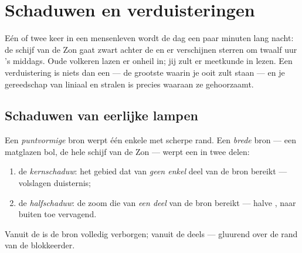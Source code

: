 \chapter{Schaduwen en verduisteringen}\label{ch:g7:shadows-eclipses}

Eén of twee keer in een mensenleven wordt de dag een paar minuten
lang nacht: de schijf van de Zon gaat zwart achter de  en er
verschijnen sterren om twaalf uur 's middags. Oude volkeren lazen er
onheil in; jij zult er meetkunde in lezen. Een verduistering is niets
dan een  --- de grootste  waarin je ooit zult staan
--- en je gereedschap van liniaal en stralen is precies waaraan ze
gehoorzaamt.

\section{Schaduwen van eerlijke lampen}

\begin{proposition}\label{prop:g7:shadows-eclipses:umbra}
Een \emph{puntvormige} bron werpt één enkele  met scherpe rand.
Een \emph{brede} bron --- een matglazen bol, de hele schijf van de Zon
--- werpt een  in twee delen:
\begin{enumerate}
  \item de \emph{kernschaduw}: het gebied dat
         van \emph{geen enkel} deel van de bron bereikt ---
        volslagen duisternis;
  \item de \emph{halfschaduw}: de zoom die
         van \emph{een deel} van de bron bereikt --- halve
        , naar buiten toe vervagend.
\end{enumerate}
Vanuit de  is de bron volledig verborgen; vanuit de
 deels --- gluurend over de rand van de blokkeerder.
\end{proposition}

